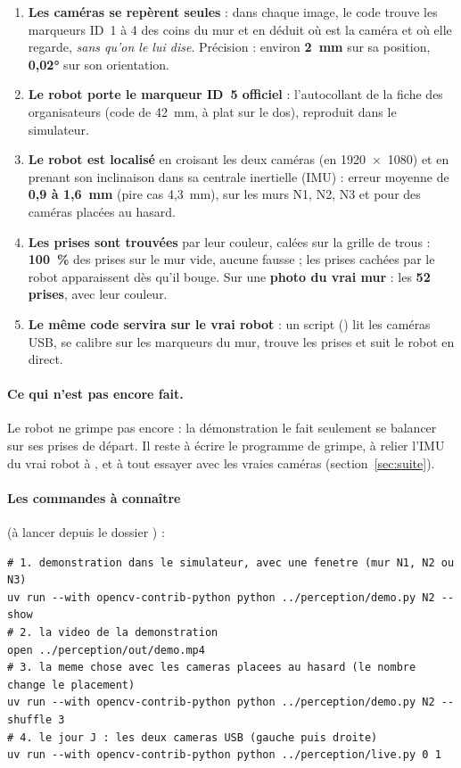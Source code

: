 \documentclass[11pt,a4paper]{article}
\newcommand{\code}[1]{\texttt{\detokenize{#1}}}
\begin{document}
\begin{retenir}
\begin{enumerate}
  \item \textbf{Les caméras se repèrent seules} : dans chaque image, le code trouve les marqueurs ID~1 à 4
        des coins du mur et en déduit où est la caméra et où elle regarde, \emph{sans qu'on le lui dise}.
        Précision : environ \textbf{2~mm} sur sa position, \textbf{0,02°} sur son orientation.
  \item \textbf{Le robot porte le marqueur ID~5 officiel} : l'autocollant de la fiche des organisateurs
        (code de 42~mm, à plat sur le dos), reproduit dans le simulateur.
  \item \textbf{Le robot est localisé} en croisant les deux caméras (en 1920~×~1080) et en prenant son
        inclinaison dans sa centrale inertielle (IMU) : erreur moyenne de \textbf{0,9 à 1,6~mm} (pire cas
        4,3~mm), sur les murs N1, N2, N3 et pour des caméras placées au hasard.
  \item \textbf{Les prises sont trouvées} par leur couleur, calées sur la grille de trous :
        \textbf{100~\%} des prises sur le mur vide, aucune fausse ; les prises cachées par le robot apparaissent
        dès qu'il bouge. Sur une \textbf{photo du vrai mur} : les \textbf{52 prises}, avec leur couleur.
  \item \textbf{Le même code servira sur le vrai robot} : un script (\code{live.py}) lit les caméras USB,
        se calibre sur les marqueurs du mur, trouve les prises et suit le robot en direct.
\end{enumerate}
\end{retenir}

\paragraph{Ce qui n'est pas encore fait.} Le robot ne grimpe pas encore : la démonstration le fait seulement
se balancer sur ses prises de départ. Il reste à écrire le programme de grimpe, à relier l'IMU du vrai robot à
\code{live.py}, et à tout essayer avec les vraies caméras (section~\ref{sec:suite}).

\paragraph{Les commandes à connaître} (à lancer depuis le dossier \code{Hackathon/simulator}) :

\begin{lstlisting}[style=sh]
# 1. demonstration dans le simulateur, avec une fenetre (mur N1, N2 ou N3)
uv run --with opencv-contrib-python python ../perception/demo.py N2 --show
# 2. la video de la demonstration
open ../perception/out/demo.mp4
# 3. la meme chose avec les cameras placees au hasard (le nombre change le placement)
uv run --with opencv-contrib-python python ../perception/demo.py N2 --shuffle 3
# 4. le jour J : les deux cameras USB (gauche puis droite)
uv run --with opencv-contrib-python python ../perception/live.py 0 1
\end{lstlisting}
\end{document}
